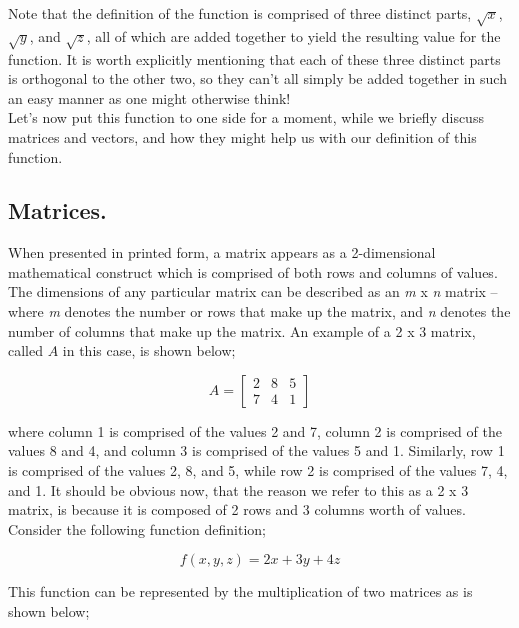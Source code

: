 \documentclass{article}
\begin{document}
Note that the definition of the function is comprised of three distinct parts, $\sqrt{x}$, $\sqrt{y}$, and
$\sqrt{z}$, all of which are added together to yield the resulting value for the function. It is worth explicitly
mentioning that each of these three distinct parts is orthogonal to the other two, so they can't all simply be 
added together in such an easy manner as one might otherwise think!\\

Let's now put this function to one side for a moment, while we briefly discuss matrices and vectors, and how they might
help us with our definition of this function.


\subsection{Matrices.}

When presented in printed form, a matrix appears as a 2-dimensional mathematical construct
which is comprised of both rows and columns of values. The dimensions of any particular matrix can be described
as an \textit{m} x \textit{n} matrix -- where \textit{m} denotes the number or rows that make up the matrix, and
\textit{n} denotes the number of columns that make up the matrix. An example of a 2 x 3 
matrix, called $A$ in this case, is shown below;

\begin{equation*}
A = 
\begin{bmatrix}
2 & 8 & 5\\
7 & 4 & 1
\end{bmatrix}
\end{equation*}

where column 1 is comprised of the values 2 and 7, column 2 is comprised of the values 8 and 4, and column 3 is
comprised of the values 5 and 1. Similarly, row 1 is comprised of the values 2, 8, and 5, while row 2 is comprised
of the values 7, 4, and 1. It should be obvious now, that the reason we refer to this as a 2 x 3 matrix, is because
it is composed of 2 rows and 3 columns worth of values.\\

Consider the following function definition;

\begin{equation*}
f(x,y,z) = 2x + 3y + 4z
\end{equation*}

This function can be represented by the multiplication of two matrices as is shown below;
\end{document}

